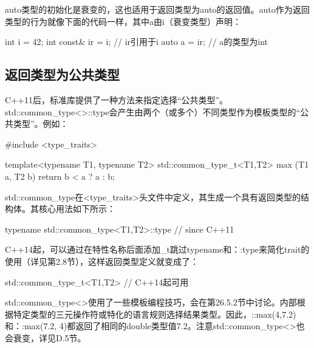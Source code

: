 auto类型的初始化是衰变的，这也适用于返回类型为auto的返回值。auto作为返回类型的行为就像下面的代码一样，其中a由i（衰变类型）声明：

\begin{cpp}
int i = 42;
int const& ir = i; // ir引用于i
auto a = ir; // a的类型为int
\end{cpp}

\subsection{返回类型为公共类型}

C++11后，标准库提供了一种方法来指定选择“公共类型”。std::common\_type<>::type会产生由两个（或多个）不同类型作为模板类型的“公共类型”。例如：

\begin{cpp}
#include <type_traits>

template<typename T1, typename T2>
std::common_type_t<T1,T2> max (T1 a, T2 b)
{
	return b < a ? a : b;
}
\end{cpp}

std::common\_type在<type\_traits>头文件中定义，其生成一个具有返回类型的结构体。其核心用法如下所示：

\begin{cpp}
typename std::common_type<T1,T2>::type // since C++11
\end{cpp}

C++14起，可以通过在特性名称后面添加\_t跳过typename和：:type来简化trait的使用（详见第2.8节），这样返回类型定义就变成了：

\begin{cpp}
std::common_type_t<T1,T2> // C++14起可用
\end{cpp}

std::common\_type<>使用了一些模板编程技巧，会在第26.5.2节中讨论。内部根据特定类型的三元操作符或特化的语言规则选择结果类型。因此，::max(4,7.2)和：:max(7.2, 4)都返回了相同的double类型值7.2。注意std::common\_type<>也会衰变，详见D.5节。




